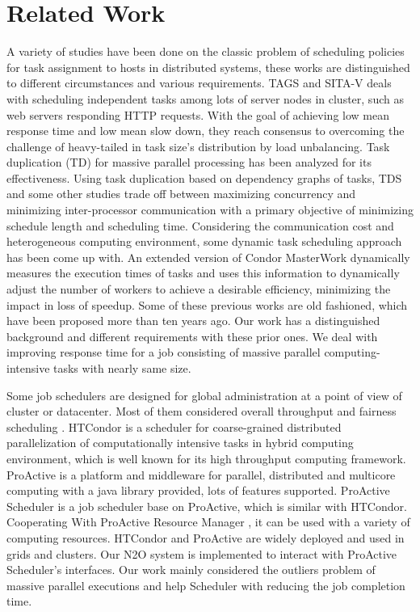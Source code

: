 \section{Related Work}

A variety of studies have been done on the classic problem of scheduling policies for task assignment to hosts in distributed systems, these works are distinguished to different circumstances and various requirements. TAGS \cite{_task_2002} and SITA-V \cite{crovella_task_1998} deals with scheduling independent tasks among lots of server nodes in cluster, such as web servers responding HTTP requests. With the goal of achieving low mean response time and low mean slow down, they reach consensus to overcoming the challenge of heavy-tailed in task size's distribution by load unbalancing. Task duplication (TD) \cite{manoharan_effect_2001} for massive parallel processing has been analyzed for its effectiveness. Using task duplication based on dependency graphs of tasks, TDS \cite{ranaweera_task_2000} and some other studies \cite{ahmad_exploiting_1998} \cite{dogan_ldbs:_2002} trade off between maximizing concurrency and minimizing inter-processor communication with a primary objective of minimizing schedule length and scheduling time. Considering the communication cost and heterogeneous computing environment, some dynamic task \cite{ahmad_semi-distributed_1991} \cite{ucar_task_2006} scheduling approach has been come up with. An extended version of Condor MasterWork \cite{heymann_adaptive_2000} dynamically measures the execution times of tasks and uses this information to dynamically adjust the number of workers to achieve a desirable efficiency, minimizing the impact in loss of speedup. Some of these previous works are old fashioned, which have been proposed more than ten years ago. Our work has a distinguished background and different requirements with these prior ones. We deal with improving response time for a job consisting of massive parallel computing-intensive tasks with nearly same size.

Some job schedulers are designed for global administration at a point of view of cluster or datacenter. Most of them considered overall throughput and fairness scheduling \cite{isard_quincy:_2009}. HTCondor\cite{_htcondor_????} is a scheduler for coarse-grained distributed parallelization of computationally intensive tasks in hybrid computing environment, which is well known for its high throughput computing framework. ProActive \cite{_proactive_????} is a platform and middleware for parallel, distributed and multicore computing with a java library provided, lots of features supported. ProActive Scheduler \cite{_proactive_????-2} is a job scheduler base on ProActive, which is similar with HTCondor. Cooperating With ProActive Resource Manager \cite{_proactive_????-1}, it can be used with a variety of computing resources. HTCondor and ProActive are widely deployed and used in grids and clusters. Our N2O system is implemented to interact with ProActive Scheduler's interfaces. Our work mainly considered the outliers problem of massive parallel executions and help Scheduler with reducing the job completion time.

